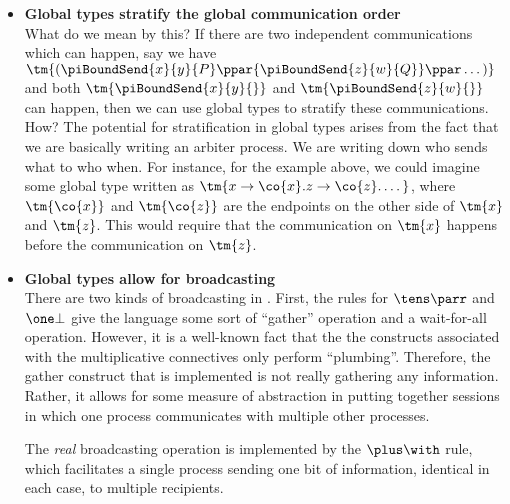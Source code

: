 \documentclass{article}
\begin{document}
\begin{itemize}
\item
  \textbf{Global types stratify the global communication order}\\
  What do we mean by this? If there are two independent communications which can
  happen, say we have
  $\tm{({\piBoundSend{x}{y}{P}}\ppar{\piBoundSend{z}{w}{Q}}\ppar\dots)}$ and
  both $\tm{\piBoundSend{x}{y}{}}$ and $\tm{\piBoundSend{z}{w}{}}$ can happen,
  then we can use global types to stratify these communications. How? The
  potential for stratification in global types arises from the fact that we are
  basically writing an arbiter process. We are writing down who sends what to
  who when. For instance, for the example above, we could imagine some global
  type written as $\tm{{x}\to{\co{x}}.{z}\to{\co{z}}.\dots}$, where
  $\tm{\co{x}}$ and $\tm{\co{z}}$ are the endpoints on the other side of
  $\tm{x}$ and $\tm{z}$. This would require that the communication on $\tm{x}$
  happens before the communication on $\tm{z}$.
\item
  \textbf{Global types allow for broadcasting}\\
  There are two kinds of broadcasting in \gcp. First, the rules for $\tens\parr$
  and $\one\bot$ give the language some sort of ``gather'' operation and a
  wait-for-all operation. However, it is a well-known fact that the the
  constructs associated with the multiplicative connectives only perform
  ``plumbing''. Therefore, the gather construct that is implemented is not
  really gathering any information. Rather, it allows for some measure of
  abstraction in putting together sessions in which one process communicates
  with multiple other processes.

  The \emph{real} broadcasting operation is implemented by the $\plus\with$
  rule, which facilitates a single process sending one bit of information,
  identical in each case, to multiple recipients.


\end{itemize}
\end{document}
